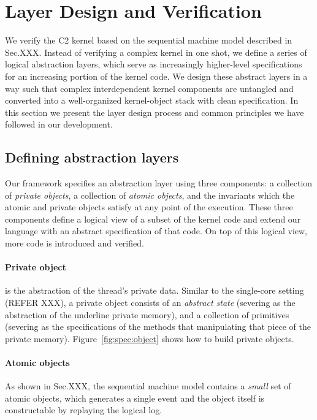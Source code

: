 \section{Layer Design and Verification}
\label{sec:spec}
We verify the C2 kernel based on the sequential machine model
described in Sec.XXX.
Instead of verifying a complex kernel in one shot,
we define a series of logical abstraction layers, which serve
as increasingly higher-level specifications for an increasing portion
of the kernel code. We design these abstract layers in a way such
that complex interdependent kernel components are untangled and
converted into a well-organized kernel-object stack with clean
specification.  In this section we present the layer design process
and common principles we have followed in our development.

\subsection{Defining abstraction layers}
\label{subsec:layer_def}
Our framework specifies an abstraction layer
using three components:
a collection of \emph{private objects},
a collection of \emph{atomic objects},
and the invariants which the atomic and private objects satisfy
at any point of the execution.
These three components define a logical view of
a subset of the kernel code
and extend our language with
an abstract specification of that code.
On top of this logical view, more code is introduced and
verified.

\paragraph{Private object} is the abstraction of the thread's
private data. 
Similar to the single-core setting (REFER XXX),
a private object consists of an \emph{abstract state} 
(severing as the abstraction of the underline private memory),
and a collection of primitives
(severing as the specifications of the methods
that manipulating that piece of the private memory).
Figure~\ref{fig:spec:object} shows how to build private objects.

\paragraph{Atomic objects}
As shown in Sec.XXX,
the sequential machine model
contains a \emph{small} set of atomic objects,
which generates a single event
and the object itself is constructable by replaying the logical log.

